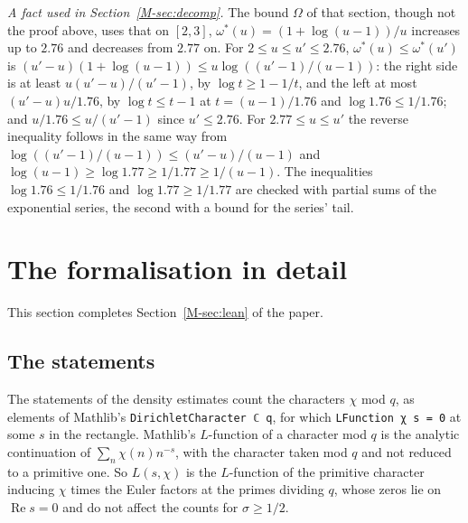 \documentclass[11pt]{article}
\newcommand{\lean}[1]{\texttt{#1}}
\numberwithin{equation}{section}
\begin{document}
\emph{A fact used in Section~\ref{M-sec:decomp}.} The bound $\Omega$ of that section, though not the proof above,
uses that on $[2, 3]$, $\omega^*(u) = (1 + \log(u - 1))/u$ increases up to $2.76$ and decreases from $2.77$ on. For
$2 \le u \le u' \le 2.76$, $\omega^*(u) \le \omega^*(u')$ is $(u' - u)(1 + \log(u - 1)) \le u \log((u' - 1)/(u - 1))$:
the right side is at least $u(u' - u)/(u' - 1)$, by $\log t \ge 1 - 1/t$, and the left at most $(u' - u)u/1.76$, by
$\log t \le t - 1$ at $t = (u - 1)/1.76$ and $\log 1.76 \le 1/1.76$; and $u/1.76 \le u/(u' - 1)$ since $u' \le 2.76$.
For $2.77 \le u \le u'$ the reverse inequality
follows in the same way from $\log((u' - 1)/(u - 1)) \le (u' - u)/(u - 1)$ and
$\log(u - 1) \ge \log 1.77 \ge 1/1.77 \ge 1/(u - 1)$. The inequalities $\log 1.76 \le 1/1.76$ and $\log 1.77 \ge
1/1.77$ are checked with partial sums of the exponential series, the second with a bound for the series' tail.

\section{The formalisation in detail}\label{sup:lean}

This section completes Section~\ref{M-sec:lean} of the paper.

\subsection*{The statements}

The statements of the density estimates count the characters $\chi$ mod $q$, as elements of Mathlib's
\lean{DirichletCharacter ℂ q}, for which \lean{LFunction χ s = 0} at some $s$ in the rectangle. Mathlib's $L$-function
of a character mod $q$ is the analytic continuation of $\sum_n \chi(n) n^{-s}$, with the character taken mod $q$ and not
reduced to a primitive one. So $L(s, \chi)$ is the $L$-function of the primitive character inducing $\chi$ times the
Euler factors at the primes dividing $q$, whose zeros lie on $\operatorname{Re} s = 0$ and do not affect the counts for
$\sigma \ge 1/2$.
\end{document}

